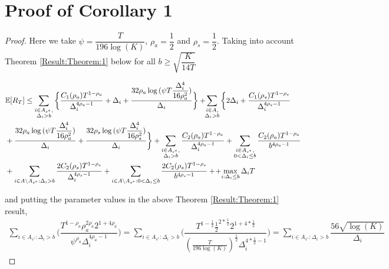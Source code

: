 \section{Proof of Corollary 1}
\label{App:Proof:Corollary:1}
\begin{proof}
Here we take $\psi=\dfrac{T}{196 \log(K)}$, $\rho_{a}=\dfrac{1}{2}$ and $\rho_{s}=\dfrac{1}{2}$. Taking into account Theorem \ref{Result:Theorem:1} below for all $b\geq \sqrt{\dfrac{K}{14 T}}$

\begin{align*}
&\mathbb{E} [R_{T}]\leq 
\sum\limits_{\substack{i\in A_{s^{*}},\\\Delta_{i} > b}}\bigg\lbrace \dfrac{C_1(\rho_{a})T^{1-\rho_{a}}}{\Delta_{i}^{4\rho_{a}-1}} + \Delta_{i}
 + \frac{32\rho_{a}\log{(\psi T\dfrac{\Delta_{i}^{4}}{16\rho_{a}^{2}})}}{\Delta_{i}} \bigg\rbrace
 + \! \! \sum\limits_{\substack{i\in A,\\\Delta_{i} > b}} \bigg\lbrace 2\Delta_{i}+
\dfrac{C_1(\rho_{s})T^{1-\rho_{s}}}{\Delta_{i}^{4\rho_{s}-1}} \\
&+ \frac{32\rho_{a}\log{(\psi T\dfrac{\Delta_{i}^{4}}{16\rho_{a}^{2}})}}{\Delta_{i}} 
+ \dfrac{32\rho_{s}\log{(\psi T\dfrac{\Delta_{i}^{4}}{16\rho_{s}^{2}})}}{\Delta_{i}}\bigg\rbrace 
+ \sum\limits_{\substack{i\in A_{s^{*}},\\ \Delta_{i} > b}} 
\frac{C_2(\rho_{a})T^{1-\rho_{a}}}{\Delta_{i}^{4\rho_{a}-1}}
+\sum\limits_{\substack{i\in A_{s^{*}},\\0 < \Delta_{i}\leq b}}\frac{C_2(\rho_a)T^{1-\rho_{a}}}{b^{4\rho_{a} -1}}\\ 
 & + \sum_{i\in A\setminus A_{s^*}: \Delta_{i} > b}\dfrac{2C_{2}(\rho_{s})T^{1-\rho_{s}}}{\Delta_{i}^{4\rho_{s}-1}} +\sum_{i\in A\setminus A_{s^*}: 0 < \Delta_{i} \leq b}\dfrac{2C_{2}(\rho_{s})T^{1-\rho_{s}}}{b^{4\rho_{s}-1}} +
 \!+\! \max\limits_{i:\Delta_{i}\leq b}\Delta_{i}T
\end{align*}

and putting the parameter values in the above Theorem \ref{Result:Theorem:1} result,
	\begin{align*}
	\sum_{i\in A_{s^{*}}:\Delta_{i} > b}\bigg(\dfrac{T^{1-\rho_{a}}\rho_{a}^{2\rho_{a}}2^{1+4\rho_{a}}}{\psi^{\rho_{a}}\Delta_{i}^{4\rho_{a}-1}} \bigg)= \sum_{i\in A_{s^{*}}:\Delta_{i} > b}\bigg(\dfrac{T^{1-\frac{1}{2}}\frac{1}{2}^{2*\frac{1}{2}}2^{1+4*\frac{1}{2}}}{(\frac{T}{196 \log (K)})^{\frac{1}{2}}\Delta_{i}^{4*\frac{1}{2}-1}} \bigg)=\sum_{i\in A_{s^{*}}:\Delta_{i} > b}\dfrac{56\sqrt{\log (K)}}{\Delta_{i}}
	\end{align*}
	

\end{proof}
